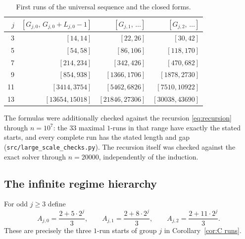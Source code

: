 \documentclass[11pt]{article}
\theoremstyle{remark}
\begin{document}
\begin{table}[h]
\centering
\caption{First runs of the universal sequence and the closed forms.}\label{tab:Cruns}
\begin{tabular}{rrrr}
\toprule
$j$ & $[G_{j,0},\,G_{j,0}+L_{j,0}-1]$ & $[G_{j,1},\,\dots]$ & $[G_{j,2},\,\dots]$\\
\midrule
3 & $[14,14]$ & $[22,26]$ & $[30,42]$\\
5 & $[54,58]$ & $[86,106]$ & $[118,170]$\\
7 & $[214,234]$ & $[342,426]$ & $[470,682]$\\
9 & $[854,938]$ & $[1366,1706]$ & $[1878,2730]$\\
11 & $[3414,3754]$ & $[5462,6826]$ & $[7510,10922]$\\
13 & $[13654,15018]$ & $[21846,27306]$ & $[30038,43690]$\\
\bottomrule
\end{tabular}
\end{table}

The formulas were additionally checked against the recursion \eqref{eq:recursion} through $n=10^{7}$: the $33$ maximal $1$-runs in that range have exactly the stated starts, and every complete run has the stated length and gap (\texttt{src/large\_scale\_checks.py}). The recursion itself was checked against the exact solver through $n=20000$, independently of the induction.

\subsection{The infinite regime hierarchy}\label{sec:Chierarchy}
For odd $j\ge3$ define
\[
A_{j,0}=\frac{2+5\cdot2^{j}}{3},\qquad
A_{j,1}=\frac{2+8\cdot2^{j}}{3},\qquad
A_{j,2}=\frac{2+11\cdot2^{j}}{3}.
\]
These are precisely the three $1$-run starts of group $j$ in Corollary~\ref{cor:C runs}.
\end{document}
